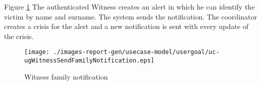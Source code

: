 Figure \ref{fig:lu.uni.lassy.excalibur.examples.icrash-RE-UCD-uc-ugWitnessSendFamilyNotification}
The authenticated Witness creates an alert in which he can identify the victim by name and surname. 
The system sends the notification. The coordinator creates a crisis for the alert and a new notification is sent
with every update of the crisis.

\begin{figure}[htbp]
\begin{center}

\texttt{[image: ./images-report-gen/usecase-model/usergoal/uc-ugWitnessSendFamilyNotification.eps]}
\end{center}
\caption[lu.uni.lassy.excalibur.examples.icrash Use Case Diagram: uc-ugWitnessSendFamilyNotification]{Witness family notification}
\label{fig:lu.uni.lassy.excalibur.examples.icrash-RE-UCD-uc-ugWitnessSendFamilyNotification}
\end{figure}
\vspace{0.5cm}
